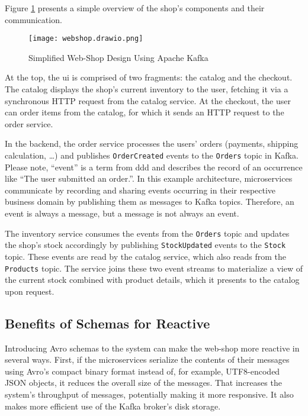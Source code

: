 Figure \ref{fig:web-shop} presents a simple overview of the shop's components and their communication.

\begin{figure}[H]
  \centering
  \texttt{[image: webshop.drawio.png]}
  \caption{Simplified Web-Shop Design Using Apache Kafka}\label{fig:web-shop}
\end{figure}

At the top, the \gls{ui} is comprised of two fragments: the catalog and the checkout.
The catalog displays the shop's current inventory to the user, fetching it via a synchronous HTTP request from the catalog service.
At the checkout, the user can order items from the catalog, for which it sends an HTTP request to the order service.

In the backend, the order service processes the users' orders (payments, shipping calculation, \ldots) and publishes \texttt{OrderCreated} events to the \texttt{Orders} topic in Kafka.
Please note, \enquote{event} is a term from \gls{ddd} and describes the record of an occurrence like \enquote{The user submitted an order.}.
In this example architecture, microservices communicate by recording and sharing events occurring in their respective business domain by publishing them as messages to Kafka topics.
Therefore, an event is always a message, but a message is not always an event.

The inventory service consumes the events from the \texttt{Orders} topic and updates the shop's stock accordingly by publishing \texttt{StockUpdated} events to the \texttt{Stock} topic.
These events are read by the catalog service, which also reads from the \texttt{Products} topic.
The service joins these two event streams to materialize a view of the current stock combined with product details, which it presents to the catalog upon request.

\subsection{Benefits of Schemas for Reactive }\label{sec:schema-benefits}

Introducing Avro schemas to the system can make the web-shop more reactive in several ways.
First, if the microservices serialize the contents of their messages using Avro's compact binary format instead of, for example, UTF8-encoded JSON objects, it reduces the overall size of the messages.
That increases the system's throughput of messages, potentially making it more responsive.
It also makes more efficient use of the Kafka broker's disk storage.

